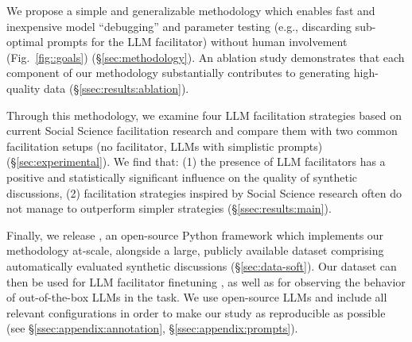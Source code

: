 We propose a simple and generalizable methodology which enables fast and inexpensive model “debugging” and parameter testing (e.g., discarding sub-optimal  prompts for the \ac{LLM} facilitator) without human involvement (Fig.~\ref{fig::goals}) (\S\ref{sec:methodology}). An ablation study demonstrates that each component of our methodology substantially contributes to generating high-quality data (\S\ref{ssec:results:ablation}). 

Through this methodology, we examine  four \ac{LLM} facilitation strategies based on current Social Science facilitation research and compare them with two common facilitation setups (no facilitator, \acp{LLM} with simplistic prompts) (\S\ref{sec:experimental}). We find that: (1) the presence of \ac{LLM} facilitators has a positive and statistically significant influence on the quality of synthetic discussions, (2) facilitation strategies inspired by Social Science research often do not manage to outperform simpler strategies (\S\ref{ssec:results:main}).

Finally, we release \syndisco, an open-source Python framework which implements our methodology at-scale, alongside \vmd\datasetlink a large, publicly available dataset comprising automatically evaluated synthetic discussions (\S\ref{sec:data-soft}). Our dataset can then be used  for \ac{LLM} facilitator finetuning \cite{ulmer2024}, as well as for observing the behavior of out-of-the-box \acp{LLM} in the task. We use open-source \acp{LLM} and include all relevant configurations in order to make our study as reproducible as possible (see \S\ref{ssec:appendix:annotation}, \S\ref{ssec:appendix:prompts}).